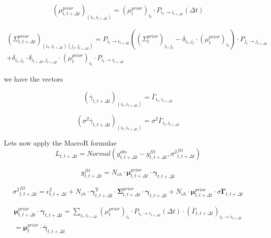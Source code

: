 \documentclass[pdflatex,sn-mathphys-num]{sn-jnl}%
\theoremstyle{thmstyleone}%
\theoremstyle{thmstyletwo}%
\theoremstyle{thmstylethree}%
\begin{document}
\begin{equation}
	(\mu^{prior}_{t, t+ \Delta t})_{(i_t, i_{t+ \Delta t})} = (\mu^{prior}_{t})_{i_t}  \cdot P_{i_t \rightarrow i_{t+ \Delta t}}(\Delta t)
\end{equation}

\begin{multline}
	(\Sigma^{prior}_{t,t+ \Delta t})_{(i_t, i_{t+ \Delta t})(j_t, j_{t+ \Delta t})} =
	P_{i_t \rightarrow i_{t+ \Delta t}} \left((\Sigma^{prior}_{t})_{i_t ,j_t} - \delta_{i_t, j_t} \cdot (\mu^{prior}_t)_{i_t} \right)  \cdot P_{j_t \rightarrow j_{t+ \Delta t}} \\
	+ \delta_{i_t, j_t} \cdot \delta_{i_{t+ \Delta t}, j_{t+ \Delta t}} \cdot (\mu^{prior}_t)_{i_t}\cdot P_{i_t \rightarrow i_{t+ \Delta t}} 
\end{multline}

we have the vectors 

\begin{equation}
	({\overline \gamma}_{t,t+\Delta t })_{(i_t, i_{t+\Delta t})} = {\overline \Gamma}_{i_t,i_{t+\Delta t}}
\end{equation}

\begin{equation}
	(\sigma^2{\overline \gamma}_{t,t+\Delta t })_{(i_t, i_{t+\Delta t})} = \sigma^2{\overline \Gamma}_{i_t,i_{t+\Delta t}}
\end{equation}

Lets now apply the MacroR formulae
\begin{equation}
	L_{t, t+\Delta t}= Normal (y^{obs}_{t, t+\Delta t}-y^{fit}_{t, t+\Delta t}, {\sigma^{2}}^{fit}_{t, t+\Delta t})
\end{equation}

\begin{equation}
	y^{fit}_{t,t+\Delta t} = N_{ch} \cdot \mathbf \mu^{prior}_{t,t+\Delta t} \cdot \mathbf \gamma_{t,t+\Delta t}
\end{equation}

\begin{equation}
	{\sigma^2}^{fit}_{t, t+\Delta t}
	= \epsilon^2_{t, t+\Delta t} +N_{ch} \cdot {\mathbf \gamma}^{\mathrm{T}}_{t, t+\Delta t} \cdot \mathbf \Sigma^{prior}_{t, t+\Delta t} \cdot \mathbf \gamma_{t, t+\Delta t}
	+ N_{ch} \cdot \mathbf \mu^{prior}_{t, t+\Delta t} \cdot {\sigma \mathbf  \Gamma}_{t, t+\Delta t}
\end{equation}

\begin{multline}
	\mathbf \mu^{prior}_{t,t+\Delta t} \cdot \mathbf \gamma_{t,t+\Delta t} =
	\sum_{i_t, i_{t+ \Delta t}} {(\mu^{prior}_{t})_{i_t}  \cdot P_{i_t \rightarrow i_{t+ \Delta t}}(\Delta t) \cdot ({\overline \Gamma_{t,t + \Delta t}})_{i_t \rightarrow i_{t+\Delta t}}}\\= \mathbf \mu^{prior}_t \cdot  \overline {\mathbf \gamma}_{t, t+\Delta t}
\end{multline}
\end{document}
